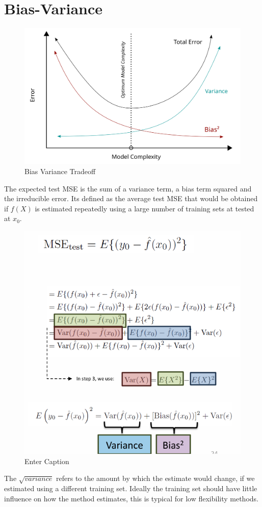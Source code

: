 \documentclass[../Main.tex]{subfiles}
\begin{document}

\newpage
\section{Bias-Variance}
\begin{figure}[H]
    \centering
    \includegraphics[width=0.75\linewidth]{Images/Bias_and_variance_contributing_to_total_error.svg.png}
    \caption{Bias Variance Tradeoff}
    \label{fig:enter-label}
\end{figure}
The expected test MSE is the sum of a variance term, a bias term squared and the irreducible error.  Its defined as the average test MSE that would be obtained if \(f(X)\) is estimated repeatedly using a large number of training sets at tested at \(x_0\).
\begin{figure}[H]
    \centering
    \includegraphics[width=0.5\linewidth]{Images/bias-variance-test-mse.png}
    \caption{Enter Caption}
    \label{fig:Test MSE Equivalent}
\end{figure}
\newpage
The \(\sqrt{variance}\) refers to the amount by which the estimate would change, if we estimated using a different training set. Ideally the training set should have little influence on how the method estimates, this is typical for low flexibility methods.
\end{document}
